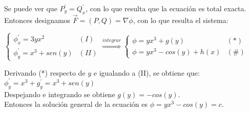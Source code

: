 \documentclass[a4paper, twoside]{article}
\numberwithin{equation}{section}
\numberwithin{figure}{section}
\numberwithin{table}{section}
\begin{document}
Se puede ver que $P^\prime_{y}=Q^\prime_{x}$, con lo que resulta que la ecuación es total exacta.\\

Entonces designamos $\vec{F}=(P,Q)=\nabla\phi$, con lo que resulta el sistema:

\begin{center}
	$\begin{cases}
	\phi^\prime_{x}=3yx^2 & (I)\\
	\phi^\prime_{y}=x^3+sen(y) & (II)\end{cases}\overset{integrar}{\Rightarrow}\begin{cases}
	\phi=yx^3+g(y) & (*)\\
	\phi=yx^3-cos(y)+h(x) & (\#)\end{cases}$
\end{center}

Derivando ({*}) respecto de $y$ e igualando a (II), se obtiene que:$\phi^\prime_{y}=x^3+g^\prime_{y}=x^3+sen(y)$\\

Despejando e integrando se obtiene $g(y)=-cos(y)$.\\

Entonces la solución general de la ecuación es $\phi=yx^3-cos(y)=c$.
\end{document}
